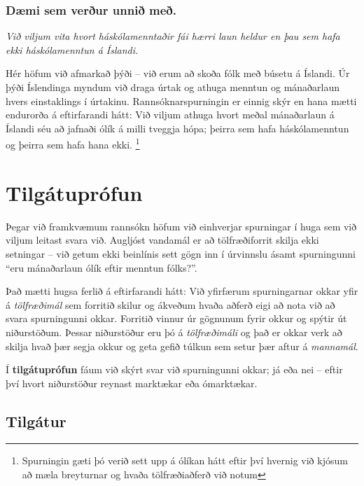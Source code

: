 \documentclass[
]{book}
\begin{document}
\hypertarget{duxe6mi-sem-veruxf0ur-unniuxf0-meuxf0.}{%
\subsection*{Dæmi sem verður unnið með.}\label{duxe6mi-sem-veruxf0ur-unniuxf0-meuxf0.}}

\emph{Við viljum vita hvort háskólamenntaðir fái hærri laun heldur en þau sem
hafa ekki háskólamenntun á Íslandi.}

Hér höfum við afmarkað þýði -- við erum að skoða fólk með búsetu á
Íslandi. Úr þýði Íslendinga myndum við draga úrtak og athuga menntun og
mánaðarlaun hvers einstaklings í úrtakinu. Rannsóknarspurningin er
einnig skýr en hana mætti endurorða á eftirfarandi hátt: Við viljum
athuga hvort meðal mánaðarlaun á Íslandi séu að jafnaði ólík á milli
tveggja hópa; þeirra sem hafa háskólamenntun og þeirra sem hafa hana
ekki. \footnote{Spurningin gæti þó verið sett upp á ólíkan hátt eftir því
  hvernig við kjósum að mæla breyturnar og hvaða tölfræðiaðferð við
  notum}

\hypertarget{tilguxe1tupruxf3fun}{%
\chapter{Tilgátuprófun}\label{tilguxe1tupruxf3fun}}

Þegar við framkvæmum rannsókn höfum við einhverjar spurningar í huga sem
við viljum leitast svara við. Augljóst vandamál er að tölfræðiforrit
skilja ekki setningar -- við getum ekki beinlínis sett gögn inn í
úrvinnslu ásamt spurningunni ``eru mánaðarlaun ólík eftir menntun
fólks?''.

Það mætti hugsa ferlið á eftirfarandi hátt: Við yfirfærum spurningarnar
okkar yfir á \emph{tölfræðimál} sem forritið skilur og ákveðum hvaða aðferð
eigi að nota við að svara spurningunni okkar. Forritið vinnur úr
gögnunum fyrir okkur og spýtir út niðurstöðum. Þessar niðurstöður eru þó
á \emph{tölfræðimáli} og það er okkar verk að skilja hvað þær segja okkur og
geta gefið túlkun sem setur þær aftur á \emph{mannamál}.

Í \textbf{tilgátuprófun} fáum við skýrt svar við spurningunni okkar; já eða
nei -- eftir því hvort niðurstöður reynast marktækar eða ómarktækar.

\hypertarget{cross}{%
\section{Tilgátur}\label{cross}}
\end{document}
